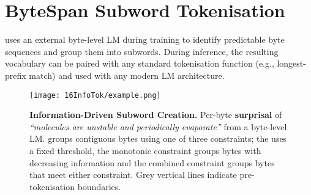 

\section{ByteSpan Subword Tokenisation}\label{sec:16-bytespan}

\tokname uses an external byte-level LM during training to identify predictable byte sequences and group them into subwords. During inference, the resulting vocabulary can be paired with any standard tokenisation function (e.g., longest-prefix match) and used with any modern LM architecture. %

\begin{figure}[!t]
    \centering
    \texttt{[image: 16InfoTok/example.png]}
    \caption{\textbf{Information-Driven Subword Creation.}
    Per-byte \textbf{surprisal} of \textit{\enquote{molecules are unstable and periodically evaporate}} from a byte-level LM. \tokname groups contiguous bytes using one of three constraints; the  uses a fixed threshold, the monotonic constraint groups bytes with decreasing information and the combined constraint groups bytes that meet either constraint. Grey vertical lines indicate pre-tokenisation boundaries.
    }
    \label{fig:16-example}
\end{figure}


